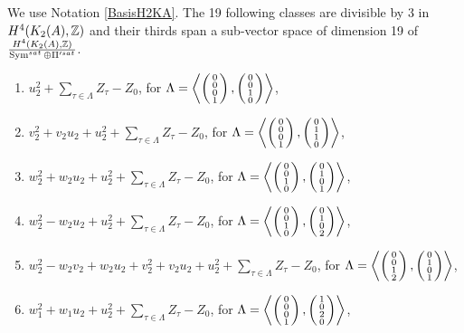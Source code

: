 \begin{prop}\label{XIX}
We use Notation \ref{BasisH2KA}.
The 19 following classes are divisible by 3 in $H^{4}(K_2(A),\Z)$ and their thirds span a sub-vector space of dimension 19 of $\frac{H^4(K_2(A),\Z)}{\Sym^{sat}\oplus\Pi'^{sat}}$.
\begin{enumerate}
\item
$u_2^2+\sum_{\tau\in \Lambda} Z_\tau-Z_0$, for $\Lambda = \plan{0\\0\\0\\1}{0\\0\\1\\0}$,
\item
$v_2^2+v_2u_2+u_2^2+\sum_{\tau\in \Lambda} Z_\tau-Z_0$, for $\Lambda= \plan{0\\0\\0\\1}{0\\1\\1\\0}$,
\item
$w_2^2+w_2u_2+u_2^2+\sum_{\tau\in \Lambda} Z_\tau-Z_0$, for $\Lambda= \plan{0\\0\\1\\0}{0\\1\\0\\1}$,
\item
$w_2^2-w_2u_2+u_2^2+\sum_{\tau\in \Lambda} Z_\tau-Z_0$, for  $\Lambda= \plan{0\\0\\1\\0}{0\\1\\0\\2}$,
\item
$w_2^2-w_2v_2+w_2u_2+v_2^2+v_2u_2+u_2^2+\sum_{\tau\in \Lambda} Z_\tau-Z_0$, for $\Lambda= \plan{0\\0\\1\\2}{0\\1\\0\\1}$,
\item
$w_1^2+w_1u_2+u_2^2+\sum_{\tau\in \Lambda} Z_\tau-Z_0$, for  $\Lambda= \plan{0\\0\\0\\1}{1\\0\\2\\0}$,

\end{enumerate}
\end{prop}
